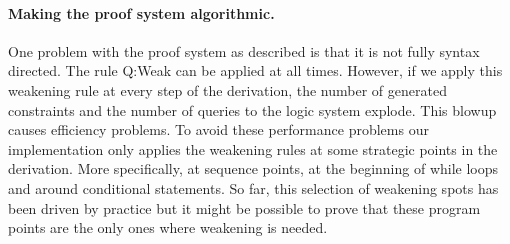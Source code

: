 \documentclass[nocopyrightspace,preprint]{sigplanconf}
\begin{document}
\paragraph{Making the proof system algorithmic.}
One problem with the proof system as described is that it is not
fully syntax directed.  The rule {\sc Q:Weak} can be applied at
all times.  However, if we apply this weakening rule at every step
of the derivation, the number of generated constraints and
the number of queries to the logic system explode.  This blowup
causes efficiency problems.  To avoid these performance problems
our implementation only applies the weakening rules at some
strategic points in the derivation.  More specifically, at sequence
points, at the beginning of while loops and around conditional
statements.  So far, this selection of weakening spots has been
driven by practice but it might be possible to prove that these
program points are the only ones where weakening is needed.







\end{document}
